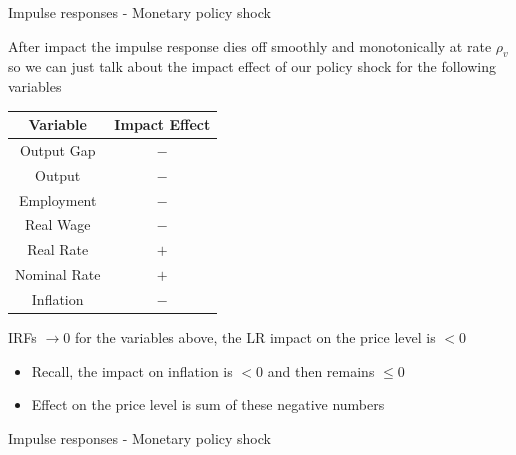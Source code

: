\documentclass{beamer}
\begin{document}
\begin{frame}{Impulse responses - Monetary policy shock}

After impact the impulse response dies off smoothly and monotonically at rate $\rho_{v}$ so we can just talk about the impact effect of our policy shock for the following variables

\begin{table}
\begin{tabular}{ c | c }
\textbf{Variable} 	& \textbf{Impact Effect}	\\ \hline \hline
  Output Gap			& $-$				\\
  Output				& $-$				\\
  Employment		& $-$				\\
  Real Wage			& $-$				\\
  Real Rate			& $+$				\\
  Nominal Rate		& $+$				\\
  Inflation			& $-$				\\ \hline \hline
\end{tabular}
\end{table}

IRFs $\rightarrow 0$ for the variables above, the LR impact on the price level is $<0$
\begin{itemize}
\item	Recall, the impact on inflation is $<0$ and then remains $\leq0$
\item	Effect on the price level is sum of these negative numbers
\end{itemize}

\end{frame}



\begin{frame}{Impulse responses - Monetary policy shock}

\begin{figure}[!htb]
\end{figure}
 
\end{frame}
\end{document}
